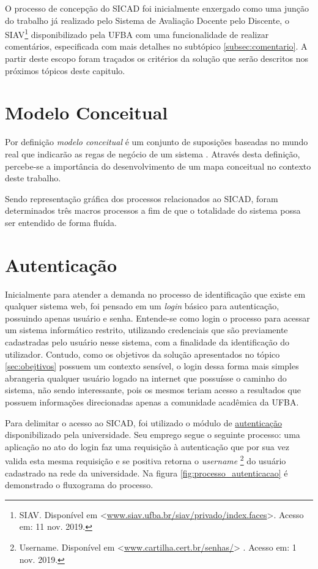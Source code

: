 \documentclass[12pt, a4paper]{report}
\begin{document}
O processo de concepção do SICAD foi inicialmente enxergado como uma junção do trabalho já realizado pelo Sistema de Avaliação Docente pelo Discente, o SIAV\footnote{SIAV. Disponível em <\url{www.siav.ufba.br/siav/privado/index.faces}>. Acesso em: 11 nov. 2019.} disponibilizado pela \ac{UFBA} com uma funcionalidade de realizar comentários, especificada com mais detalhes no subtópico \ref{subsec:comentario}. A partir deste escopo foram traçados os critérios da solução que serão descritos nos próximos tópicos deste capitulo.

\section{ Modelo Conceitual}
Por definição \textit{modelo conceitual} é um conjunto de suposições baseadas no mundo real que indicarão as regas de negócio de um sistema \citep{mapaconceitual}. Através desta definição, percebe-se a importância do desenvolvimento de um mapa conceitual no contexto deste trabalho.

Sendo representação gráfica dos processos relacionados ao \ac{SICAD}, foram determinados três macros processos a fim de que o totalidade do sistema possa ser entendido de forma fluída.


\section{ Autenticação}

Inicialmente para atender a demanda no processo de identificação que existe em qualquer sistema web, foi pensado em um \textit{login} básico para autenticação, possuindo apenas usuário e senha. Entende-se como login o processo para acessar um sistema informático restrito, utilizando credenciais que são previamente cadastradas pelo usuário nesse sistema, com a finalidade da identificação do utilizador. Contudo, como os objetivos da solução apresentados no tópico \ref{sec:obejtivos} possuem um contexto sensível, o login dessa forma mais simples abrangeria qualquer usuário logado na internet que possuísse o caminho do sistema, não sendo interessante, pois os mesmos teriam acesso a resultados que possuem informações direcionadas apenas a comunidade acadêmica da UFBA.

Para delimitar o acesso ao \ac{SICAD}, foi utilizado o módulo de \href{https://www.autenticacao.ufba.br}{autenticação} disponibilizado pela universidade. Seu emprego segue o seguinte processo: uma aplicação no ato do login faz uma requisição à autenticação que por sua vez valida esta mesma requisição e se positiva retorna o \textit{username} \footnote{Username. Disponível em <\url{www.cartilha.cert.br/senhas/}> . Acesso em: 1 nov. 2019.} do usuário cadastrado na rede da universidade. Na figura \ref{fig:processo_autenticacao} é demonstrado o fluxograma do processo.
\end{document}
